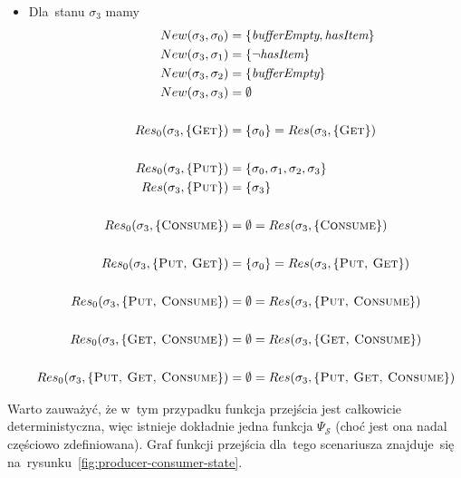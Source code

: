 \documentclass[11pt,a4paper]{article}
\begin{document}
\begin{itemize}
    \item Dla~stanu $\sigma_3$ mamy
    \begin{align*}
        New(\sigma_3, \sigma_0) &= \{ \textit{bufferEmpty}, \textit{hasItem} \} \\
        New(\sigma_3, \sigma_1) &= \{ \neg \textit{hasItem} \} \\
        New(\sigma_3, \sigma_2) &= \{ \textit{bufferEmpty} \} \\
        New(\sigma_3, \sigma_3) &= \emptyset \\
        \\
        Res_0(\sigma_3, \{ \textsc{Get} \}) &= \{ \sigma_0 \} = Res(\sigma_3, \{ \textsc{Get} \}) \\
        \\
        Res_0(\sigma_3, \{ \textsc{Put} \}) &= \{ \sigma_0, \sigma_1, \sigma_2, \sigma_3 \} \\
        Res(\sigma_3, \{ \textsc{Put} \}) &= \{ \sigma_3 \} \\
        \\
        Res_0(\sigma_3, \{ \textsc{Consume} \}) &= \emptyset = Res(\sigma_3, \{ \textsc{Consume} \}) \\
        \\
        Res_0(\sigma_3, \{ \textsc{Put, Get} \}) &= \{ \sigma_0 \} = Res(\sigma_3, \{ \textsc{Put, Get} \}) \\
        \\
        Res_0(\sigma_3, \{ \textsc{Put, Consume} \}) &= \emptyset = Res(\sigma_3, \{ \textsc{Put, Consume} \}) \\
        \\
        Res_0(\sigma_3, \{ \textsc{Get, Consume} \}) &= \emptyset = Res(\sigma_3, \{ \textsc{Get, Consume} \}) \\
        \\
        Res_0(\sigma_3, \{ \textsc{Put, Get, Consume} \}) &= \emptyset = Res(\sigma_3, \{ \textsc{Put, Get, Consume} \})
    \end{align*}
\end{itemize}

Warto zauważyć, że w~tym przypadku funkcja przejścia jest całkowicie deterministyczna, więc istnieje dokładnie jedna funkcja $\Psi_\mathcal{S}$ (choć jest ona nadal częściowo zdefiniowana).
Graf funkcji przejścia dla~tego scenariusza znajduje~się na~rysunku~\ref{fig:producer-consumer-state}.
\end{document}
